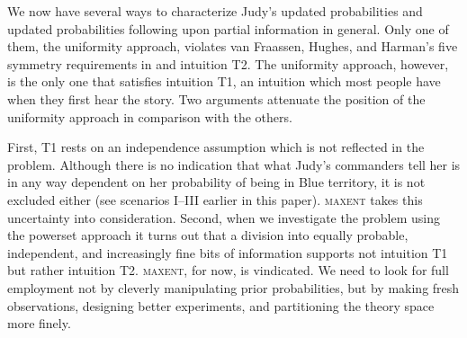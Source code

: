 \documentclass[12pt]{article}
\begin{document}
We now have several ways to characterize Judy's updated
probabilities and updated probabilities following upon partial
information in general. Only one of them, the uniformity approach,
violates van Fraassen, Hughes, and Harman's five symmetry requirements
in  and intuition T2. The uniformity
approach, however, is the only one that satisfies intuition T1, an
intuition which most people have when they first hear the story. Two
arguments attenuate the position of the uniformity approach in
comparison with the others. 

First, T1 rests on an independence assumption which is not reflected
in the problem. Although there is no indication that what Judy's
commanders tell her is in any way dependent on her probability of
being in Blue territory, it is not excluded either (see scenarios
I--III earlier in this paper). \textsc{maxent} takes this uncertainty
into consideration. Second, when we investigate the problem using the
powerset approach it turns out that a division into equally probable,
independent, and increasingly fine bits of information supports not
intuition T1 but rather intuition T2. \textsc{maxent}, for now, is
vindicated. We need to look for full employment not by cleverly
manipulating prior probabilities, but by making fresh observations,
designing better experiments, and partitioning the theory space more
finely.



 

\end{document}
